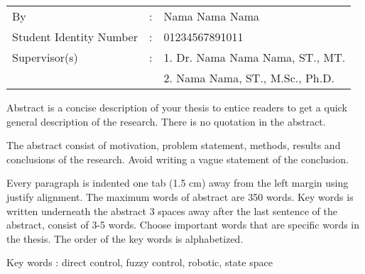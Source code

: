 
\begin{tabular}{lcl}
By &:& Nama Nama Nama\\
Student Identity Number &:& 01234567891011\\
Supervisor(s) &:& 1. Dr. Nama Nama Nama, ST., MT.\\
& & 2. Nama Nama, ST., M.Sc., Ph.D.\\
\end{tabular}

\vspace{1ex}


Abstract is a concise description of your thesis to entice readers to get a quick general description of the research. There is no quotation in the abstract. 

The abstract consist of motivation, problem statement, methods, results and conclusions of the research. Avoid writing a vague statement of the conclusion.

Every paragraph is indented one tab (1.5 cm) away from the left margin using justify alignment. The maximum words of abstract are 350 words. Key words is written underneath the abstract 3 spaces away after the last sentence of the abstract, consist of 3-5 words. Choose important words that are specific words in the thesis. The order of the key words is alphabetized.

\vspace{6ex}

\noindent Key words : direct control, fuzzy control, robotic, state space